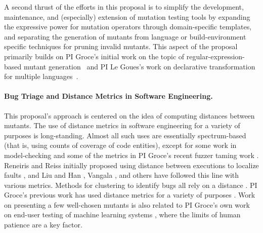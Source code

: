 A second thrust of the efforts in this proposal is to simplify the
development, maintenance, and (especially) extension of mutation
testing tools by
expanding the expressive power for
mutation operators through domain-specific templates, and separating the generation of mutants from
language or build-environment specific techniques for pruning invalid
mutants.  This aspect of the proposal primarily builds on PI Groce's initial work on the topic of
regular-expression-based mutant generation~\cite{regexpMut} and
PI Le Goues's work on declarative transformation for multiple languages~\cite{rvt-ppc}.

\paragraph{Bug Triage and Distance Metrics in Software Engineering.}
%
This proposal's approach is centered on
the idea of computing distances between mutants.  The use of distance metrics in
software engineering for a variety of  
purposes is long-standing.  Almost all such uses are
essentially spectrum-based \cite{RepsSpectra} (that is, using counts
of coverage of code entities), except for some work in model-checking
\cite{GroceDist,ChakiLev} and some of the metrics in PI Groce's recent fuzzer
taming work \cite{PLDI13}.  Reneiris and Reiss initially proposed
using distance between executions to localize faults
\cite{NearNeighbor}, and Liu and Han \cite{Liu06}, Vangala \cite{VangalaDist}, and others have
followed this line with various metrics.
Methods for clustering to identify bugs all rely on a distance \cite{Podgurski04}.  PI Groce's previous work
has used distance metrics for a variety of purposes 
\cite{PLDI13,icst2014,issta14,distMut}.
Work on
presenting a few well-chosen mutants
is also related to PI Groce's own work on end-user testing of machine learning
systems \cite{EndUserMistake,OnlyOracle}, where the limits of human
patience are a key factor.  
